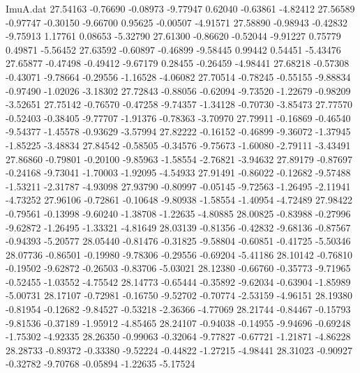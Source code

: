 \begin{filecontents}{ImuA.dat}
  27.54163   -0.76690   -0.08973   -9.77947    0.62040   -0.63861   -4.82412
  27.56589   -0.97747   -0.30150   -9.66700    0.95625   -0.00507   -4.91571
  27.58890   -0.98943   -0.42832   -9.75913    1.17761    0.08653   -5.32790
  27.61300   -0.86620   -0.52044   -9.91227    0.75779    0.49871   -5.56452
  27.63592   -0.60897   -0.46899   -9.58445    0.99442    0.54451   -5.43476
  27.65877   -0.47498   -0.49412   -9.67179    0.28455   -0.26459   -4.98441
  27.68218   -0.57308   -0.43071   -9.78664   -0.29556   -1.16528   -4.06082
  27.70514   -0.78245   -0.55155   -9.88834   -0.97490   -1.02026   -3.18302
  27.72843   -0.88056   -0.62094   -9.73520   -1.22679   -0.98209   -3.52651
  27.75142   -0.76570   -0.47258   -9.74357   -1.34128   -0.70730   -3.85473
  27.77570   -0.52403   -0.38405   -9.77707   -1.91376   -0.78363   -3.70970
  27.79911   -0.16869   -0.46540   -9.54377   -1.45578   -0.93629   -3.57994
  27.82222   -0.16152   -0.46899   -9.36072   -1.37945   -1.85225   -3.48834
  27.84542   -0.58505   -0.34576   -9.75673   -1.60080   -2.79111   -3.43491
  27.86860   -0.79801   -0.20100   -9.85963   -1.58554   -2.76821   -3.94632
  27.89179   -0.87697   -0.24168   -9.73041   -1.70003   -1.92095   -4.54933
  27.91491   -0.86022   -0.12682   -9.57488   -1.53211   -2.31787   -4.93098
  27.93790   -0.80997   -0.05145   -9.72563   -1.26495   -2.11941   -4.73252
  27.96106   -0.72861   -0.10648   -9.80938   -1.58554   -1.40954   -4.72489
  27.98422   -0.79561   -0.13998   -9.60240   -1.38708   -1.22635   -4.80885
  28.00825   -0.83988   -0.27996   -9.62872   -1.26495   -1.33321   -4.81649
  28.03139   -0.81356   -0.42832   -9.68136   -0.87567   -0.94393   -5.20577
  28.05440   -0.81476   -0.31825   -9.58804   -0.60851   -0.41725   -5.50346
  28.07736   -0.86501   -0.19980   -9.78306   -0.29556   -0.69204   -5.41186
  28.10142   -0.76810   -0.19502   -9.62872   -0.26503   -0.83706   -5.03021
  28.12380   -0.66760   -0.35773   -9.71965   -0.52455   -1.03552   -4.75542
  28.14773   -0.65444   -0.35892   -9.62034   -0.63904   -1.85989   -5.00731
  28.17107   -0.72981   -0.16750   -9.52702   -0.70774   -2.53159   -4.96151
  28.19380   -0.81954   -0.12682   -9.84527   -0.53218   -2.36366   -4.77069
  28.21744   -0.84467   -0.15793   -9.81536   -0.37189   -1.95912   -4.85465
  28.24107   -0.94038   -0.14955   -9.94696   -0.69248   -1.75302   -4.92335
  28.26350   -0.99063   -0.32064   -9.77827   -0.67721   -1.21871   -4.86228
  28.28733   -0.89372   -0.33380   -9.52224   -0.44822   -1.27215   -4.98441
  28.31023   -0.90927   -0.32782   -9.70768   -0.05894   -1.22635   -5.17524

\end{filecontents}
